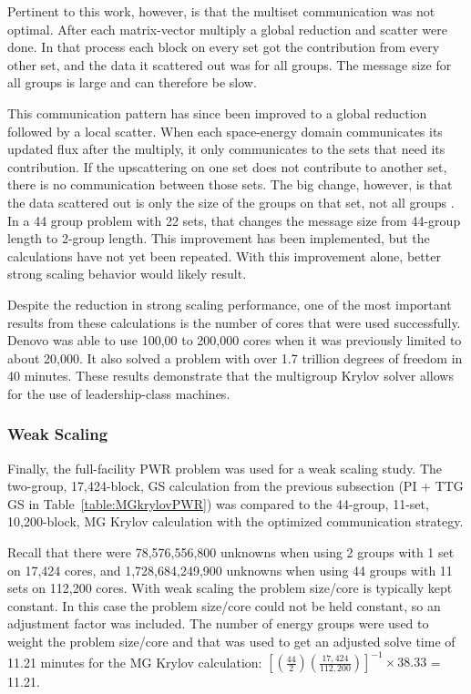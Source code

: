 Pertinent to this work, however, is that the multiset communication was not optimal. After each matrix-vector multiply a global reduction and scatter were done. In that process each block on every set got the contribution from every other set, and the data it scattered out was for all groups. The message size for all groups is large and can therefore be slow.

This communication pattern has since been improved to a global reduction followed by a local scatter. When each space-energy domain communicates its updated flux after the multiply, it only communicates to the sets that need its contribution. If the upscattering on one set does not contribute to another set, there is no communication between those sets. The big change, however, is that the data scattered out is only the size of the groups on that set, not all groups \cite{Evans2011b}. In a 44 group problem with 22 sets, that changes the message size from 44-group length to 2-group length. This improvement has been implemented, but the calculations have not yet been repeated. With this improvement alone, better strong scaling behavior would likely result. 

Despite the reduction in strong scaling performance, one of the most important results from these calculations is the number of cores that were used successfully. Denovo was able to use 100,00 to 200,000 cores when it was previously limited to about 20,000. It also solved a problem with over 1.7 trillion degrees of freedom in 40 minutes. These results demonstrate that the multigroup Krylov solver allows for the use of leadership-class machines.

\subsubsection{Weak Scaling}
Finally, the full-facility PWR problem was used for a weak scaling study. The two-group, 17,424-block, GS calculation from the previous subsection (PI + TTG GS in Table~\ref{table:MGkrylovPWR}) was compared to the 44-group, 11-set, 10,200-block, MG Krylov calculation with the optimized communication strategy. 

Recall that there were 78,576,556,800 unknowns when using 2 groups with 1 set on 17,424 cores, and 1,728,684,249,900 unknowns when using 44 groups with 11 sets on 112,200 cores. With weak scaling the problem size/core is typically kept constant. In this case the problem size/core could not be held constant, so an adjustment factor was included. The number of energy groups were used to weight the problem size/core and that was used to get an adjusted solve time of 11.21 minutes for the MG Krylov calculation: $[(\frac{44}{2})(\frac{17,424}{112,200})]^{-1}\times38.33$ = 11.21. 

